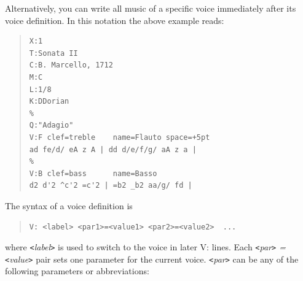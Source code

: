 \documentclass[a4paper]{article}
\begin{document}
Alternatively, you can write all music of a specific voice immediately
after its voice definition. In this notation the above example reads:

\begin{quote}
\begin{verbatim}
X:1
T:Sonata II
C:B. Marcello, 1712
M:C
L:1/8
K:DDorian
%
Q:"Adagio"
V:F clef=treble    name=Flauto space=+5pt
ad fe/d/ eA z A | dd d/e/f/g/ aA z a | 
%
V:B clef=bass      name=Basso  
d2 d'2 ^c'2 =c'2 | =b2 _b2 aa/g/ fd | 
\end{verbatim}
\end{quote}

The syntax of a voice definition is

\begin{quote}
\begin{verbatim}
V: <label> <par1>=<value1> <par2>=<value2>  ...
\end{verbatim}
\end{quote}

where {\it \verb$<$label\verb$>$ } is used to switch to the voice in later 
V: lines. Each {\it \verb$<$par\verb$>$ = \verb$<$value\verb$>$ } pair sets one 
parameter for the current voice. {\it \verb$<$par\verb$>$ } can be any 
of the following parameters or abbreviations:
\end{document}
